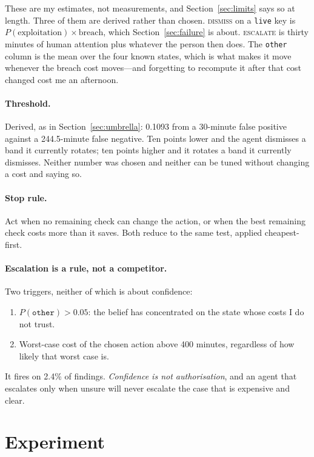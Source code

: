 \documentclass{article}
\begin{document}
These are my estimates, not measurements, and Section~\ref{sec:limits} says so at
length. Three of them are derived rather than chosen. \textsc{dismiss} on a
\texttt{live} key is $P(\text{exploitation}) \times \text{breach}$, which
Section~\ref{sec:failure} is about. \textsc{escalate} is thirty minutes of human
attention plus whatever the person then does. The \texttt{other} column is the
mean over the four known states, which is what makes it move whenever the breach
cost moves---and forgetting to recompute it after that cost changed cost me an
afternoon.

\paragraph{Threshold.} Derived, as in Section~\ref{sec:umbrella}: 0.1093 from a
30-minute false positive against a 244.5-minute false negative. Ten points lower
and the agent dismisses a band it currently rotates; ten points higher and it
rotates a band it currently dismisses. Neither number was chosen and neither can
be tuned without changing a cost and saying so.

\paragraph{Stop rule.} Act when no remaining check can change the action, or when
the best remaining check costs more than it saves. Both reduce to the same test,
applied cheapest-first.

\paragraph{Escalation is a rule, not a competitor.} Two triggers, neither of which
is about confidence:
\begin{enumerate}
\item $P(\texttt{other}) > 0.05$: the belief has concentrated on the state whose
costs I do not trust.
\item Worst-case cost of the chosen action above 400 minutes, regardless of how
likely that worst case is.
\end{enumerate}
It fires on 2.4\% of findings. \emph{Confidence is not authorisation}, and an
agent that escalates only when unsure will never escalate the case that is
expensive and clear.

\section{Experiment}
\label{sec:exp}
\end{document}
